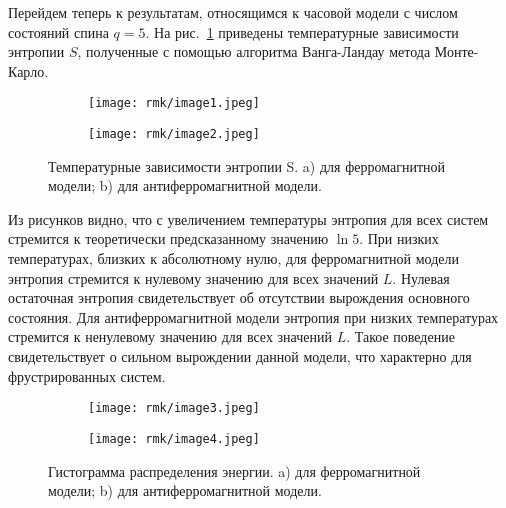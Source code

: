 %
%

Перейдем теперь к результатам, относящимся к часовой модели с числом состояний спина $q = 5$. На рис.~\ref{fig:rmk-1} приведены температурные зависимости энтропии $S$, полученные с помощью алгоритма Ванга-Ландау метода Монте-Карло.

\begin{figure}[ht]
    \begin{subfigure}{0.5\textwidth}
        \texttt{[image: rmk/image1.jpeg]}
        \caption{}
    \end{subfigure}
    \begin{subfigure}{0.5\textwidth}
        \texttt{[image: rmk/image2.jpeg]}
        \caption{}
    \end{subfigure}
    \caption{Температурные зависимости энтропии S. a) для ферромагнитной модели; b) для антиферромагнитной модели.}
    \label{fig:rmk-1}
\end{figure}

Из рисунков видно, что с увеличением температуры энтропия для всех систем стремится к теоретически предсказанному значению $\ln 5$. При низких температурах, близких к абсолютному нулю, для ферромагнитной модели энтропия стремится к нулевому значению для всех значений $L$. Нулевая остаточная энтропия свидетельствует об отсутствии вырождения основного состояния. Для антиферромагнитной модели энтропия при низких температурах стремится к ненулевому значению для всех значений $L$. Такое поведение свидетельствует о сильном вырождении данной модели, что характерно для фрустрированных систем.

\begin{figure}[ht]
    \begin{subfigure}{0.5\textwidth}
        \texttt{[image: rmk/image3.jpeg]}
        \caption{}
        \label{fig:rmk-2:a}
    \end{subfigure}
    \begin{subfigure}{0.5\textwidth}
        \texttt{[image: rmk/image4.jpeg]}
        \caption{}
        \label{fig:rmk-2:b}
    \end{subfigure}
    \caption{Гистограмма распределения энергии. a) для ферромагнитной модели; b) для антиферромагнитной модели.}
    \label{fig:rmk-2}
\end{figure}

